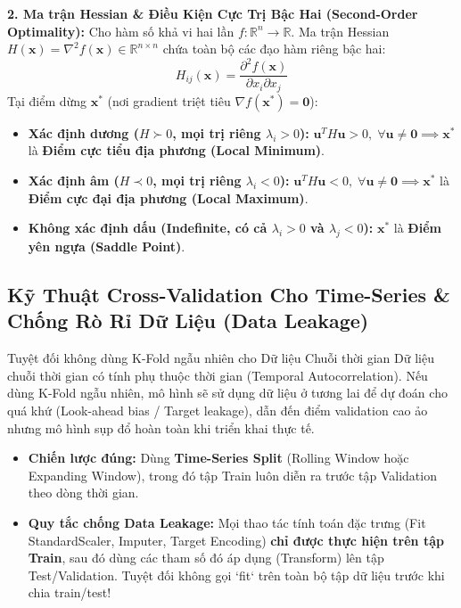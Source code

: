 \documentclass[10pt,a4paper]{article}
\begin{document}
\textbf{2. Ma trận Hessian \& Điều Kiện Cực Trị Bậc Hai (Second-Order Optimality):}
Cho hàm số khả vi hai lần $f: \mathbb{R}^n \to \mathbb{R}$. Ma trận Hessian $H(\mathbf{x}) = \nabla^2 f(\mathbf{x}) \in \mathbb{R}^{n \times n}$ chứa toàn bộ các đạo hàm riêng bậc hai:
\begin{equation}
    H_{ij}(\mathbf{x}) = \frac{\partial^2 f(\mathbf{x})}{\partial x_i \partial x_j}
\end{equation}
Tại điểm dừng $\mathbf{x}^*$ (nơi gradient triệt tiêu $\nabla f(\mathbf{x}^*) = \mathbf{0}$):
\begin{itemize}[leftmargin=*]
    \item \textbf{Xác định dương ($H \succ 0$, mọi trị riêng $\lambda_i > 0$):} $\mathbf{u}^T H \mathbf{u} > 0, \; \forall \mathbf{u} \neq \mathbf{0} \implies \mathbf{x}^*$ là \textbf{Điểm cực tiểu địa phương (Local Minimum)}.
    \item \textbf{Xác định âm ($H \prec 0$, mọi trị riêng $\lambda_i < 0$):} $\mathbf{u}^T H \mathbf{u} < 0, \; \forall \mathbf{u} \neq \mathbf{0} \implies \mathbf{x}^*$ là \textbf{Điểm cực đại địa phương (Local Maximum)}.
    \item \textbf{Không xác định dấu (Indefinite, có cả $\lambda_i > 0$ và $\lambda_j < 0$):} $\mathbf{x}^*$ là \textbf{Điểm yên ngựa (Saddle Point)}.
\end{itemize}

\subsection{Kỹ Thuật Cross-Validation Cho Time-Series \& Chống Rò Rỉ Dữ Liệu (Data Leakage)}
\begin{trapbox}{Tuyệt đối không dùng K-Fold ngẫu nhiên cho Dữ liệu Chuỗi thời gian}
Dữ liệu chuỗi thời gian có tính phụ thuộc thời gian (Temporal Autocorrelation). Nếu dùng K-Fold ngẫu nhiên, mô hình sẽ sử dụng dữ liệu ở tương lai để dự đoán cho quá khứ (Look-ahead bias / Target leakage), dẫn đến điểm validation cao ảo nhưng mô hình sụp đổ hoàn toàn khi triển khai thực tế.
\begin{itemize}[leftmargin=*]
    \item \textbf{Chiến lược đúng:} Dùng \textbf{Time-Series Split} (Rolling Window hoặc Expanding Window), trong đó tập Train luôn diễn ra trước tập Validation theo dòng thời gian.
    \item \textbf{Quy tắc chống Data Leakage:} Mọi thao tác tính toán đặc trưng (Fit StandardScaler, Imputer, Target Encoding) \textbf{chỉ được thực hiện trên tập Train}, sau đó dùng các tham số đó áp dụng (Transform) lên tập Test/Validation. Tuyệt đối không gọi `fit` trên toàn bộ tập dữ liệu trước khi chia train/test!
\end{itemize}
\end{trapbox}
\end{document}
